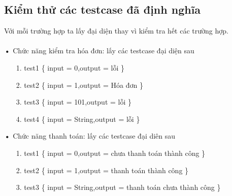 \documentclass[a4paper,12pt]{report}
\begin{document}
\subsection{Kiểm thử các testcase đã định nghĩa}
Với mỗi trường hợp ta lấy đại diện thay vì kiểm tra hết các trường hợp.\\
\\
\textbf{•} Chức năng kiểm tra hóa đơn: lấy các testcase đại diện sau
\begin{itemize}
\item[1.] test1 \{ input = 0,output = lỗi \}
\item[2.] test2 \{ input = 1,output = Hóa đơn \}
\item[3.] test3 \{ input = 101,output = lỗi \}
\item[4.] test4 \{ input = String,output = lỗi \}
\end{itemize}
\textbf{•} Chức năng thanh toán: lấy các testcase đại diên sau
\begin{itemize}
\item[1.] test1 \{ input = 0,output = chưa thanh toán thành công \}
\item[2.] test2 \{ input = 1,output = thanh toán thành công \}
\item[3.] test3 \{ input = String,output = thanh toán chưa thành công \}
\end{itemize}
\end{document}
